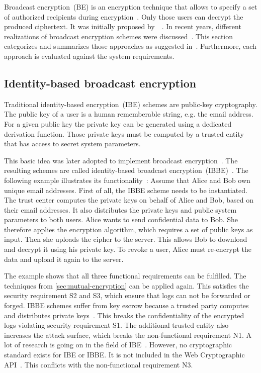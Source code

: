 \documentclass[../main.tex]{subfiles}
\begin{document}
Broadcast encryption~(BE) is an encryption technique that allows to specify a set of authorized recipients during encryption~\cite{Hagg2022}.
Only those users can decrypt the produced ciphertext.
It was initially proposed by~\citeauthor{fiat1993broadcast}~\cite{fiat1993broadcast}.
In recent years, different realizations of broadcast encryption schemes were discussed~\cite{Sakai2007, Li2018, Hagg2022, Fan2013}.
This section categorizes and summarizes those approaches as suggested in~\cite{Hagg2022}.
Furthermore, each approach is evaluated against the system requirements.

\subsection{Identity-based broadcast encryption} 
\label{sec:broadcast-identity}

Traditional identity-based encryption~(IBE) schemes are public-key cryptography.
The public key of a user is a human rememberable string, e.g. the email address.
For a given public key the private key can be generated using a dedicated derivation function.
Those private keys must be computed by a trusted entity that has access to secret system parameters.~\cite{shamir1985}

This basic idea was later adopted to implement broadcast encryption~\cite{Hagg2022}.
The resulting schemes are called identity-based broadcast encryption~(IBBE)~\cite{Sakai2007}.
The following example illustrates its functionality~\cite{Hagg2022}:
Assume that Alice and Bob own unique email addresses.
First of all, the IBBE scheme needs to be instantiated.
The trust center computes the private keys on behalf of Alice and Bob, based on their email addresses.
It also distributes the private keys and public system parameters to both users.
Alice wants to send confidential data to Bob.
She therefore applies the encryption algorithm, which requires a set of public keys as input.
Then she uploads the cipher to the server.
This allows Bob to download and decrypt it using his private key.
To revoke a user, Alice must re-encrypt the data and upload it again to the server.

The example shows that all three functional requirements can be fulfilled.
The techniques from \cref{sec:mutual-encryption} can be applied again.
This satisfies the security requirement S2 and S3, which ensure that logs can not be forwarded or forged.
IBBE schemes suffer from key escrow because a trusted party computes and distributes private keys~\cite{Hagg2022}.
This breaks the confidentiality of the encrypted logs violating security requirement S1.
The additional trusted entity also increases the attack surface, which breaks the non-functional requirement N1.
A lot of research is going on in the field of IBE~\cite{Hagg2022}.
However, no cryptographic standard exists for IBE or IBBE.
It is not included in the Web Cryptographic API~\cite{WebCryptoApi2017}.
This conflicts with the non-functional requirement N3.
\end{document}
